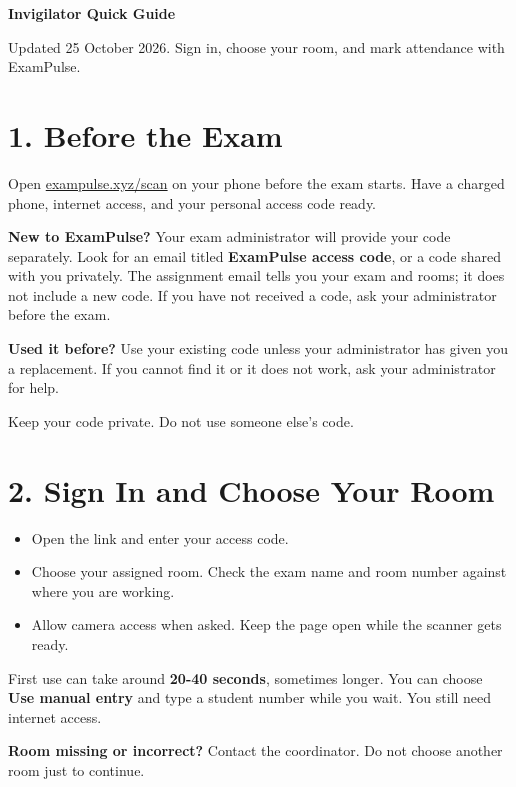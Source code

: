 \documentclass[10pt,a4paper]{article}
\begin{document}
{\LARGE\bfseries Invigilator Quick Guide}\par\medskip
Updated 25 October 2026. Sign in, choose your room, and mark attendance with ExamPulse.\par
\section*{1. Before the Exam}
Open \href{https://exampulse.xyz/scan}{exampulse.xyz/scan} on your phone before the exam starts. Have a charged phone, internet access, and your personal access code ready.\par
\textbf{New to ExamPulse?} Your exam administrator will provide your code separately. Look for an email titled \textbf{ExamPulse access code}, or a code shared with you privately. The assignment email tells you your exam and rooms; it does not include a new code. If you have not received a code, ask your administrator before the exam.\par
\textbf{Used it before?} Use your existing code unless your administrator has given you a replacement. If you cannot find it or it does not work, ask your administrator for help.\par
Keep your code private. Do not use someone else's code.\par
\section*{2. Sign In and Choose Your Room}
\begin{itemize}\item[1.] Open the link and enter your access code.\end{itemize}
\begin{itemize}\item[2.] Choose your assigned room. Check the exam name and room number against where you are working.\end{itemize}
\begin{itemize}\item[3.] Allow camera access when asked. Keep the page open while the scanner gets ready.\end{itemize}
First use can take around \textbf{20-40 seconds}, sometimes longer. You can choose \textbf{Use manual entry} and type a student number while you wait. You still need internet access.\par
\textbf{Room missing or incorrect?} Contact the coordinator. Do not choose another room just to continue.\par
\end{document}
